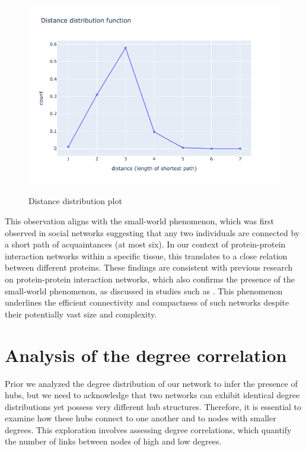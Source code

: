\documentclass[paper=a4,fontsize=11pt,DIV=8,BCOR=5mm,oneside,pdftex,bibtotocnumbered]{scrreprt}
\theoremstyle{plain}
\begin{document}
	\begin{figure}
		\centering
		\caption{Distance distribution plot}
		\includegraphics[scale=0.6]{distance_distribution.png}
		\label{fig:dist_distribution}
	\end{figure}
	
	This observation aligns with the small-world phenomenon, which was first observed in social networks suggesting that any two individuals are connected by a short path of acquaintances (at most six). In our context of protein-protein interaction networks within a specific tissue, this translates to a close relation between different proteins. These findings are consistent with previous research on protein-protein interaction networks, which also confirms the presence of the small-world phenomenon, as discussed in studies such as \cite{Wang2010}. This phenomenon underlines the efficient connectivity and compactness of such networks despite their potentially vast size and complexity.
	
	\section{Analysis of the degree correlation}
	Prior we analyzed the degree distribution of our network to infer the presence of hubs, but we need to acknowledge that two networks can exhibit identical degree distributions yet possess very different hub structures. Therefore, it is essential to examine how these hubs connect to one another and to nodes with smaller degrees. This exploration involves assessing degree correlations, which quantify the number of links between nodes of high and low degrees. 
	
\end{document}

